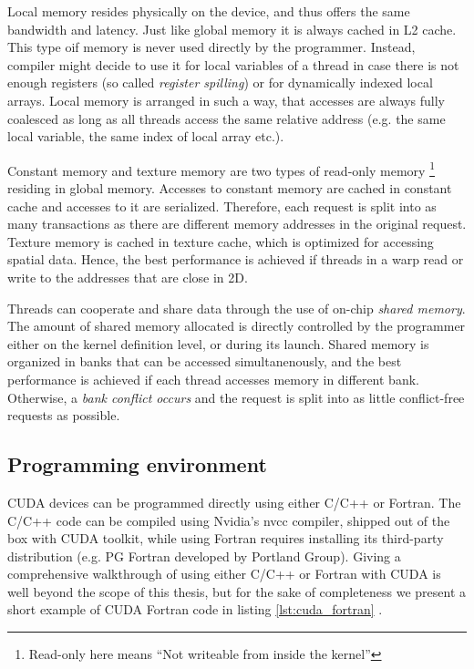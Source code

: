 Local memory resides physically on the device, and thus offers the same bandwidth and latency. Just like global memory it is always cached in L2 cache. This type oif memory is never used directly by the programmer. Instead, compiler might decide to use it for local variables of a thread in case there is not enough registers (so called \emph{register spilling}) or for dynamically indexed local arrays. Local memory is arranged in such a way, that accesses are always fully coalesced as long as all threads access the same relative address (e.g. the same local variable, the same index of local array etc.).

Constant memory and texture memory are two types of read-only memory \footnote{Read-only here means ``Not writeable from inside the kernel''} residing in global memory. Accesses to constant memory are cached in constant cache and accesses to it are serialized. Therefore, each request is split into as many  transactions as there are different memory addresses in the original request. Texture memory is cached in texture cache, which is optimized for accessing spatial data. Hence, the best performance is achieved if threads in a warp read or write to the addresses that are close in 2D.

Threads can cooperate and share data through the use of on-chip \emph{shared  memory}. The amount of shared memory allocated is directly controlled by the programmer either on the kernel definition level, or during its launch. Shared memory is organized in banks that can be accessed simultanenously, and the best performance is achieved if each thread accesses memory in different bank. Otherwise, a \emph{bank conflict occurs} and the request is split into as little conflict-free requests as possible.


\subsection{Programming environment}
CUDA devices can be programmed directly using either C/C++ or Fortran. The C/C++ code can be compiled using Nvidia's nvcc compiler, shipped out of the box with CUDA toolkit, while using Fortran requires installing its third-party distribution (e.g. PG Fortran developed by Portland Group). Giving a comprehensive walkthrough of using either C/C++ or Fortran with CUDA is well beyond the scope of this thesis, but for the sake of completeness we present a short example of CUDA Fortran code in listing \ref{lst:cuda_fortran} .

